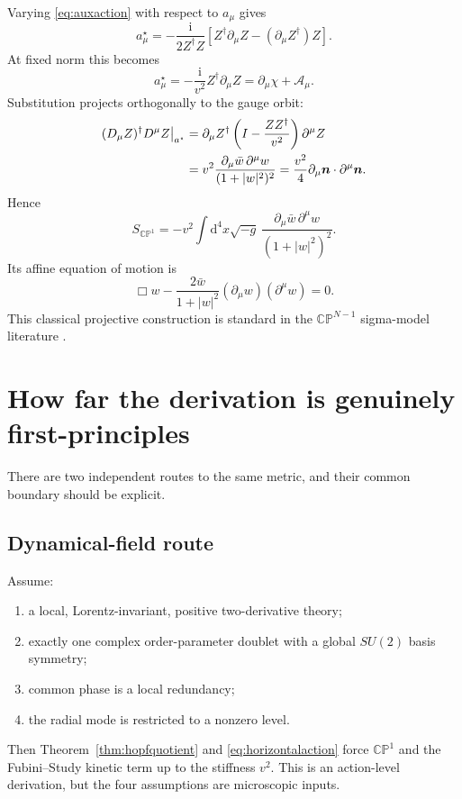 \documentclass[11pt]{article}
\numberwithin{equation}{section}
\newcommand{\CP}{\mathbb{CP}}
\newcommand{\dd}{\mathrm d}
\newcommand{\ii}{\mathrm i}
\begin{document}
Varying \eqref{eq:auxaction} with respect to \(a_\mu\) gives
\begin{equation}
 a_\mu^\star=-\frac{\ii}{2Z^\dagger Z}
 \left[Z^\dagger\partial_\mu Z
 -(\partial_\mu Z^\dagger)Z\right].
 \label{eq:astargeneral}
\end{equation}
At fixed norm this becomes
\begin{equation}
 a_\mu^\star=-\frac{\ii}{v^2}Z^\dagger\partial_\mu Z
 =\partial_\mu\chi+\mathcal A_\mu.
 \label{eq:astar}
\end{equation}
Substitution projects orthogonally to the gauge orbit:
\begin{align}
 (D_\mu Z)^\dagger D^\mu Z\big|_{a^\star}
 &=\partial_\mu Z^\dagger
 \left(I-\frac{ZZ^\dagger}{v^2}\right)\partial^\mu Z
 \notag\\
 &=v^2\frac{\partial_\mu\bar w\,\partial^\mu w}
 {(1+|w|^2)^2}
 =\frac{v^2}{4}\partial_\mu\bm n\cdot\partial^\mu\bm n.
 \label{eq:horizontalaction}
\end{align}
Hence
\begin{equation}
 S_{\CP^1}=-v^2\int\dd^4x\sqrt{-g}\,
 \frac{\partial_\mu\bar w\,\partial^\mu w}{(1+|w|^2)^2}.
 \label{eq:cp1action}
\end{equation}
Its affine equation of motion is
\begin{equation}
 \Box w-\frac{2\bar w}{1+|w|^2}
 (\partial_\mu w)(\partial^\mu w)=0.
 \label{eq:cpeom}
\end{equation}
This classical projective construction is standard in the
\(\CP^{N-1}\) sigma-model literature \cite{DAdda1978}.

\section{How far the derivation is genuinely first-principles}

There are two independent routes to the same metric, and their common boundary
should be explicit.

\subsection{Dynamical-field route}

Assume:
\begin{enumerate}
\item a local, Lorentz-invariant, positive two-derivative theory;
\item exactly one complex order-parameter doublet with a global \(SU(2)\)
basis symmetry;
\item common phase is a local redundancy;
\item the radial mode is restricted to a nonzero level.
\end{enumerate}
Then Theorem~\ref{thm:hopfquotient} and \eqref{eq:horizontalaction} force
\(\CP^1\) and the Fubini--Study kinetic term up to the stiffness \(v^2\).
This is an action-level derivation, but the four assumptions are microscopic
inputs.
\end{document}
